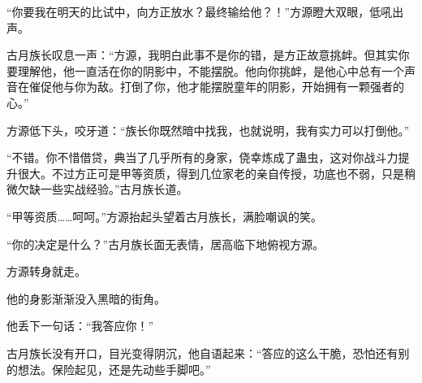 \begin{this_body}
“你要我在明天的比试中，向方正放水？最终输给他？！”方源瞪大双眼，低吼出声。

古月族长叹息一声：“方源，我明白此事不是你的错，是方正故意挑衅。但其实你要理解他，他一直活在你的阴影中，不能摆脱。他向你挑衅，是他心中总有一个声音在催促他与你为敌。打倒了你，他才能摆脱童年的阴影，开始拥有一颗强者的心。”

方源低下头，咬牙道：“族长你既然暗中找我，也就说明，我有实力可以打倒他。”

“不错。你不惜借贷，典当了几乎所有的身家，侥幸炼成了蛊虫，这对你战斗力提升很大。不过方正可是甲等资质，得到几位家老的亲自传授，功底也不弱，只是稍微欠缺一些实战经验。”古月族长道。

“甲等资质……呵呵。”方源抬起头望着古月族长，满脸嘲讽的笑。

“你的决定是什么？”古月族长面无表情，居高临下地俯视方源。

方源转身就走。

他的身影渐渐没入黑暗的街角。

他丢下一句话：“我答应你！”

古月族长没有开口，目光变得阴沉，他自语起来：“答应的这么干脆，恐怕还有别的想法。保险起见，还是先动些手脚吧。”

\end{this_body}

